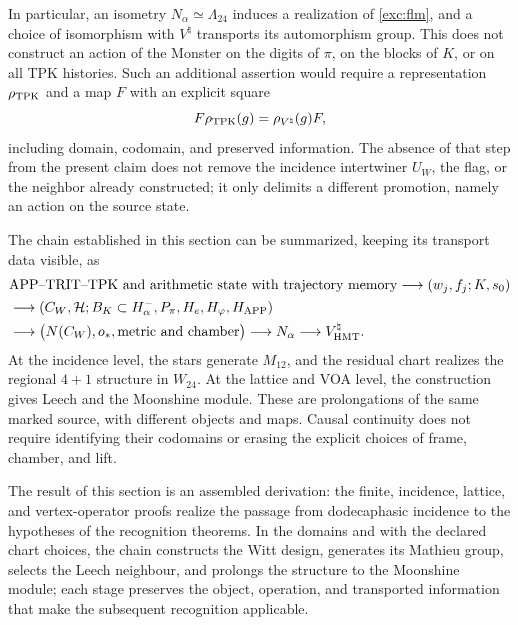 \par
In particular, an isometry $N_\alpha\simeq\Lambda_{24}$ induces
a realization of \eqref{exc:flm}, and a choice of isomorphism
with $V^\natural$ transports its automorphism group. This does not
construct an action of the Monster on the digits of
$\pi$, on the blocks of $K$, or on all TPK histories.
Such an additional assertion would require a representation
$\rho_{\rm TPK}$ and a map $F$ with an explicit square
\[
 F\rho_{\rm TPK}(g)=\rho_{V^\natural}(g)F,
\]
including domain, codomain, and preserved information. The absence
of that step from the present claim does not remove the incidence
intertwiner $U_W$, the flag, or the neighbor already constructed; it only
delimits a different promotion, namely an action on the source state.

The chain established in this section can be summarized, keeping
its transport data visible, as
\begin{align*}
 &\text{APP--TRIT--TPK and arithmetic state with trajectory memory}
   \longrightarrow (w_j,f_j;K,s_0)\\
 &\longrightarrow (C_W,\mathcal H;B_K\subset H^-_\alpha,
                   P_\pi,H_e,H_\varphi,H_{\rm APP})\\
 &\longrightarrow \bigl(N(C_W),o_*,\text{metric and chamber}\bigr)
   \longrightarrow N_\alpha
   \longrightarrow V^\natural_{\rm HMT}.
\end{align*}
At the incidence level, the stars generate $M_{12}$, and the
residual chart realizes the regional $4+1$ structure in $W_{24}$.
At the lattice and VOA level, the construction gives Leech and the
Moonshine module. These are prolongations of the same marked source, with
different objects and maps. Causal continuity does not require
identifying their codomains or erasing the explicit choices
of frame, chamber, and lift.

The result of this section is an assembled derivation: the finite,
incidence, lattice, and vertex-operator proofs realize the passage from
dodecaphasic incidence to the hypotheses of the recognition
theorems. In the domains and with the declared chart choices,
the chain constructs the Witt design, generates its Mathieu group, selects
the Leech neighbour, and prolongs the structure to the Moonshine module; each
stage preserves the object, operation, and transported information
that make the subsequent recognition applicable.
